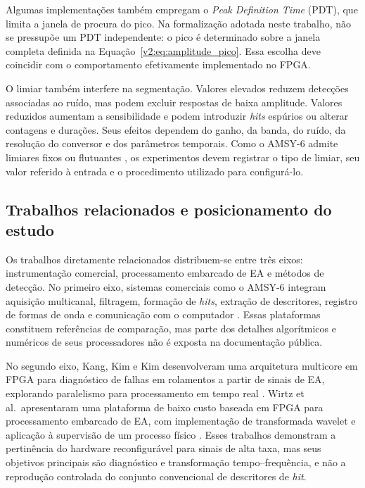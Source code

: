 Algumas implementações também empregam o \textit{Peak Definition Time} (PDT), que limita a janela de procura do pico. Na formalização adotada neste trabalho, não se pressupõe um PDT independente: o pico é determinado sobre a janela completa definida na Equação~\eqref{v2:eq:amplitude_pico}. Essa escolha deve coincidir com o comportamento efetivamente implementado no FPGA.

O limiar também interfere na segmentação. Valores elevados reduzem detecções associadas ao ruído, mas podem excluir respostas de baixa amplitude. Valores reduzidos aumentam a sensibilidade e podem introduzir \textit{hits} espúrios ou alterar contagens e durações. Seus efeitos dependem do ganho, da banda, do ruído, da resolução do conversor e dos parâmetros temporais. Como o AMSY-6 admite limiares fixos ou flutuantes \cite{vallen2022}, os experimentos devem registrar o tipo de limiar, seu valor referido à entrada e o procedimento utilizado para configurá-lo.

\subsection{Trabalhos relacionados e posicionamento do estudo}
\label{v2:subsec:trabalhos_relacionados}

Os trabalhos diretamente relacionados distribuem-se entre três eixos: instrumentação comercial, processamento embarcado de EA e métodos de detecção. No primeiro eixo, sistemas comerciais como o AMSY-6 integram aquisição multicanal, filtragem, formação de \textit{hits}, extração de descritores, registro de formas de onda e comunicação com o computador \cite{vallen2022}. Essas plataformas constituem referências de comparação, mas parte dos detalhes algorítmicos e numéricos de seus processadores não é exposta na documentação pública.

No segundo eixo, Kang, Kim e Kim desenvolveram uma arquitetura multicore em FPGA para diagnóstico de falhas em rolamentos a partir de sinais de EA, explorando paralelismo para processamento em tempo real \cite{kang2015}. Wirtz et al.\ apresentaram uma plataforma de baixo custo baseada em FPGA para processamento embarcado de EA, com implementação de transformada wavelet e aplicação à supervisão de um processo físico \cite{wirtz2018}. Esses trabalhos demonstram a pertinência do hardware reconfigurável para sinais de alta taxa, mas seus objetivos principais são diagnóstico e transformação tempo--frequência, e não a reprodução controlada do conjunto convencional de descritores de \textit{hit}.

